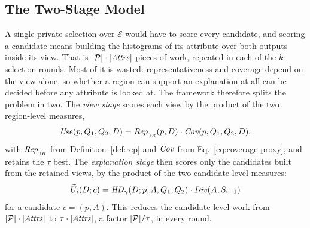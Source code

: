 \subsection{The Two-Stage Model}
\label{subsec:two-stages}

A single private selection over $\mathcal{E}$ would have to score every candidate, and scoring a candidate means building the histograms of its attribute over both outputs inside its view.
That is $|\mathcal{P}|\cdot|\mathit{Attrs}|$ pieces of work, repeated in each of the $k$ selection rounds.
Most of it is wasted: representativeness and coverage depend on the view alone, so whether a region can support an explanation at all can be decided before any attribute is looked at.
The framework therefore splits the problem in two.
The \emph{view stage} scores each view by the product of the two region-level measures,
\begin{equation}
\mathit{Use}(p,Q_1,Q_2,D)= \mathit{Rep}_{\gamma_R}(p,D)\cdot \mathit{Cov}(p,Q_1,Q_2,D),
\label{eq:usefulness-proxy}
\end{equation}
with $\mathit{Rep}_{\gamma_R}$ from Definition~\ref{def:rep} and $\mathit{Cov}$ from Eq.~\eqref{eq:coverage-proxy}, and retains the $\tau$ best.
The \emph{explanation stage} then scores only the candidates built from the retained views, by the product of the two candidate-level measures:
\begin{equation}
\widetilde{U}_i(D;c)=\mathit{HD}_{\gamma}(D;p,A,Q_1,Q_2)\cdot \mathit{Div}(A,S_{i-1})
\label{eq:selection-utility}
\end{equation}
for a candidate $c=(p,A)$.
This reduces the candidate-level work from $|\mathcal{P}|\cdot|\mathit{Attrs}|$ to $\tau\cdot|\mathit{Attrs}|$, a factor $|\mathcal{P}|/\tau$, in every round.

